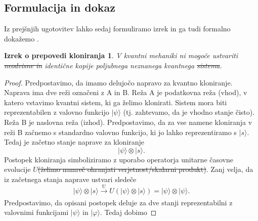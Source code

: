 \documentclass[12pt]{article}
\newtheorem*{remark}{Izrek o prepovedi kloniranja}
\providecommand{\DIFadd}[1]{{\protect\color{blue}\uwave{#1}}} %
\providecommand{\DIFdel}[1]{{\protect\color{red}\sout{#1}}}                      %
\providecommand{\DIFaddbegin}{} %
\providecommand{\DIFaddend}{} %
\providecommand{\DIFdelbegin}{} %
\providecommand{\DIFdelend}{} %
\newcommand{\DIFscaledelfig}{0.5}
\newlength{\DIFdelgraphicswidth} %
\newlength{\DIFdelgraphicsheight} %
\newcommand{\DIFaddincludegraphics}[2][]{{\color{blue}\fbox{\DIFOincludegraphics[#1]{#2}}}} %
\newcommand{\DIFdelincludegraphics}[2][]{%
\sbox{\DIFdelgraphicsbox}{\DIFOincludegraphics[#1]{#2}}%
\settoboxwidth{\DIFdelgraphicswidth}{\DIFdelgraphicsbox} %
\settoboxtotalheight{\DIFdelgraphicsheight}{\DIFdelgraphicsbox} %
\scalebox{\DIFscaledelfig}{%
\parbox[b]{\DIFdelgraphicswidth}{\usebox{\DIFdelgraphicsbox}\\[-\baselineskip] \rule{\DIFdelgraphicswidth}{0em}}\llap{\resizebox{\DIFdelgraphicswidth}{\DIFdelgraphicsheight}{%
\setlength{\unitlength}{\DIFdelgraphicswidth}%
\begin{picture}(1,1)%
\thicklines\linethickness{2pt} %
{\color[rgb]{1,0,0}\put(0,0){\framebox(1,1){}}}%
{\color[rgb]{1,0,0}\put(0,0){\line( 1,1){1}}}%
{\color[rgb]{1,0,0}\put(0,1){\line(1,-1){1}}}%
\end{picture}%
}\hspace*{3pt}}} %
} %
\DeclareRobustCommand{\DIFaddbegin}{\DIFOaddbegin \let\includegraphics\DIFaddincludegraphics} %
\DeclareRobustCommand{\DIFaddend}{\DIFOaddend \let\includegraphics\DIFOincludegraphics} %
\DeclareRobustCommand{\DIFdelbegin}{\DIFOdelbegin \let\includegraphics\DIFdelincludegraphics} %
\DeclareRobustCommand{\DIFdelend}{\DIFOaddend \let\includegraphics\DIFOincludegraphics} %
\begin{document}
 \subsection{Formulacija in dokaz}

 Iz prejšnjih ugotovitev lahko sedaj formuliramo izrek in ga tudi formalno dokažemo \cite{nielsenQuantumComputationQuantum2012}.

 
\begin{remark} V kvantni mehaniki ni mogoče ustvariti \DIFdelbegin \DIFdel{neodvisne in }\DIFdelend identične kopije poljubnega neznanega kvantnega \DIFdelbegin \DIFdel{sistema}\DIFdelend \DIFaddbegin \DIFadd{stanja}\DIFaddend . 
\end{remark}

\begin{proof}
Predpostavimo, da imamo delujočo napravo za kvantno kloniranje. Naprava ima dve reži označeni z A in B. Reža A je podatkovna reža (vhod), v katero vstavimo kvantni sistem, ki ga želimo klonirati. Sistem mora biti reprezentabilen z valovno funkcijo $| \psi \rangle$ (tj. zahtevamo, da je vhodno stanje čisto). Reža B je naslovna reža (izhod). Predpostavimo, da za vse namene kloniranja v reži B začnemo s standardno valovno funkcijo, ki jo lahko reprezentiramo s $| s \rangle$. Tedaj je začetno stanje naprave za kloniranje
\begin{equation}
| \psi \rangle \otimes | s \rangle.
\end{equation}
Postopek kloniranja simboliziramo z uporabo operatorja unitarne časovne evolucije $U$\DIFdelbegin \DIFdel{(želimo namreč ohranjati verjetnost/skalarni produkt)}\DIFdelend . Zanj velja, da iz začetnega stanja naprave ustvari sledeče
\begin{equation}
| \psi \rangle \otimes | s \rangle \xrightarrow[\text{}]{\text{U}} U(| \psi \rangle \otimes | s \rangle) = | \psi \rangle \otimes | \psi \rangle.
\end{equation}
Predpostavimo, da opisani postopek deluje za dve stanji reprezentabilni z valovnimi funkcijami $| \psi \rangle$ in $| \varphi \rangle$. Tedaj dobimo 


\end{proof}
\end{document}
